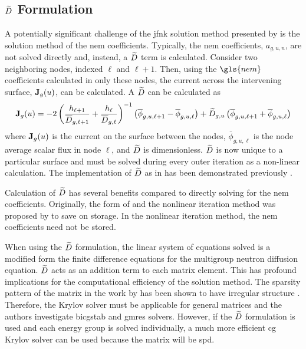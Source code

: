   \subsection{\texorpdfstring{$\widetilde{D}$ Formulation}{D\textasciitilde \ Formulation}}
    \label{sec:dtilde_formulation}

    A potentially significant challenge of the \gls{jfnk} solution method 
    presented by \citeauthor{qe2paper} is the solution method of the \gls{nem}
    coefficients. Typically, the \gls{nem} coefficients, $a_{g,u,n}$, are not
    solved directly and, instead, a $\widetilde{D}$ term is calculated. Consider two
    neighboring nodes, indexed $\ell$ and $\ell+1$. Then, using the $\gls{nem}$
    coefficients calculated in only these nodes, the current across the 
    intervening surface, $\mathbf{J}_g(u)$, can be calculated. A $\widetilde{D}$ can be 
    calculated as
    \begin{equation}
      \label{eq:dtilde}
      \mathbf{J}_g(u) = 
        -2 \left( \frac{h_{\ell+1}}{\overline{D}_{g,\ell+1}} + 
          \frac{h_{\ell}}{\overline{D}_{g,\ell}} \right)^{-1}
          \left( \overline{\phi}_{g,u,\ell+1} -
          \overline{\phi}_{g,u,\ell} \right) + 
        \widetilde{D}_{g,u} \left( \overline{\phi}_{g,u,\ell+1} +
          \overline{\phi}_{g,u,\ell} \right)
    \end{equation}
    where $\mathbf{J}_g(u)$ is the current on the surface between the nodes,
    $\overline{\phi}_{g,u,\ell}$ is the node average scalar flux in node $\ell$,
    and $\widetilde{D}$ is dimensionless. $\widetilde{D}$ is now unique to a particular
    surface and must be solved during every outer iteration as a non-linear
    calculation. The implementation of $\widetilde{D}$ as in  has been
    demonstrated previously \cite{smith_nonlinear,palmtagThesis}.

    Calculation of $\widetilde{D}$ has several benefits compared to directly solving
    for the \gls{nem} coefficients. Originally, the form of  and
    the nonlinear iteration method was proposed by \citeauthor{smith_nonlinear}
    to save on storage. In the nonlinear iteration method, the \gls{nem}
    coefficients need not be stored.

    When using the $\widetilde{D}$ formulation, the linear system of equations solved
    is a modified form the finite difference equations for the multigroup
    neutron diffusion equation. $\widetilde{D}$ acts as an addition term to each
    matrix element. This has profound implications for the computational
    efficiency of the solution method. The sparsity pattern of the matrix in the
    work by \citeauthor{qe2paper} has been shown to have irregular
    structure \cite{palmtagThesis}. Therefore, the Krylov solver must be
    applicable for general matrices and the authors investigate \gls{bicgstab}
    and \gls{gmres} solvers. However, if the $\widetilde{D}$ formulation is used and
    each energy group is solved individually, a much more efficient \gls{cg}
    Krylov solver can be used because the matrix will be \gls{spd}. 

